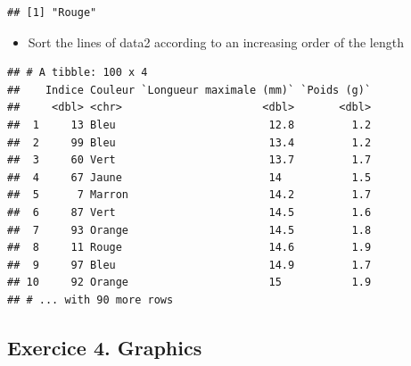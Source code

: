 \documentclass[]{article}
\newenvironment{Shaded}{\begin{snugshade}}{\end{snugshade}}
\newcommand{\KeywordTok}[1]{\textcolor[rgb]{0.13,0.29,0.53}{\textbf{#1}}}
\newcommand{\DataTypeTok}[1]{\textcolor[rgb]{0.13,0.29,0.53}{#1}}
\newcommand{\StringTok}[1]{\textcolor[rgb]{0.31,0.60,0.02}{#1}}
\newcommand{\OperatorTok}[1]{\textcolor[rgb]{0.81,0.36,0.00}{\textbf{#1}}}
\newcommand{\NormalTok}[1]{#1}
\providecommand{\tightlist}{%
  \setlength{\itemsep}{0pt}\setlength{\parskip}{0pt}}
\begin{document}
\begin{verbatim}
## [1] "Rouge"
\end{verbatim}

\begin{itemize}
\tightlist
\item
  Sort the lines of data2 according to an increasing order of the length
\end{itemize}

\begin{Shaded}
\end{Shaded}

\begin{verbatim}
## # A tibble: 100 x 4
##    Indice Couleur `Longueur maximale (mm)` `Poids (g)`
##     <dbl> <chr>                      <dbl>       <dbl>
##  1     13 Bleu                        12.8         1.2
##  2     99 Bleu                        13.4         1.2
##  3     60 Vert                        13.7         1.7
##  4     67 Jaune                       14           1.5
##  5      7 Marron                      14.2         1.7
##  6     87 Vert                        14.5         1.6
##  7     93 Orange                      14.5         1.8
##  8     11 Rouge                       14.6         1.9
##  9     97 Bleu                        14.9         1.7
## 10     92 Orange                      15           1.9
## # ... with 90 more rows
\end{verbatim}

\subsection{Exercice 4. Graphics}\label{exercice-4.-graphics}

\begin{Shaded}
\end{Shaded}
\end{document}
